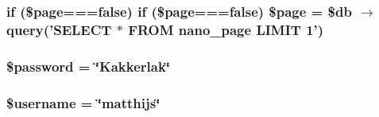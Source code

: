 \hypertarget{Bootstrap_8php_50663ba988a223616576d11c5d905a3a}{
\subsubsection[{\$page}]{\setlength{\rightskip}{0pt plus 5cm}if (\$page===false) if (\$page===false) \$page = \$db $\rightarrow$ query('SELECT $\ast$ FROM nano\_\-page LIMIT 1')}}
\label{Bootstrap_8php_50663ba988a223616576d11c5d905a3a}


\hypertarget{Bootstrap_8php_607686ef9f99ea7c42f4f3dd3dbb2b0d}{
\subsubsection[{\$password}]{\setlength{\rightskip}{0pt plus 5cm}\$password = \char`\"{}Kakkerlak\char`\"{}}}
\label{Bootstrap_8php_607686ef9f99ea7c42f4f3dd3dbb2b0d}


\hypertarget{Bootstrap_8php_0eb82aa5f81cf845de4b36cd653c42cf}{
\subsubsection[{\$username}]{\setlength{\rightskip}{0pt plus 5cm}\$username = \char`\"{}matthijs\char`\"{}}}
\label{Bootstrap_8php_0eb82aa5f81cf845de4b36cd653c42cf}


\hypertarget{Bootstrap_8php_6733eb5f605d09eaede9845835d71c4e}{
\subsubsection[{exit}]{}}
\label{Bootstrap_8php_6733eb5f605d09eaede9845835d71c4e}


